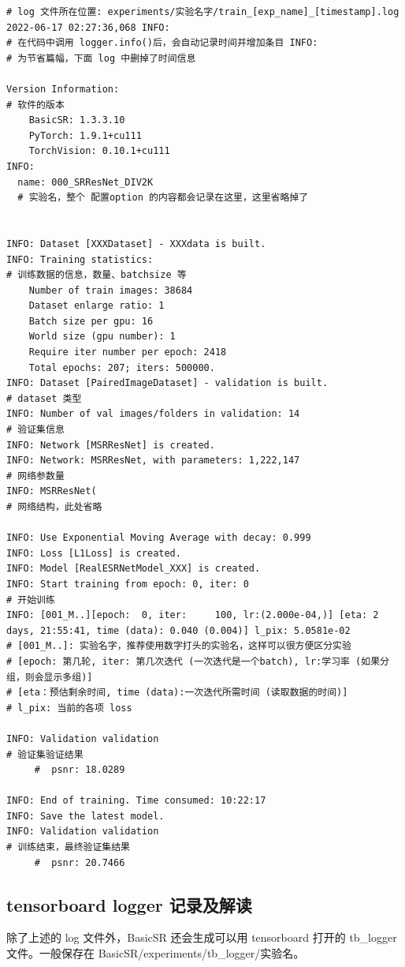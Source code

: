 \documentclass[../main.tex]{subfiles}
\begin{document}
\begin{verbatim}
# log 文件所在位置: experiments/实验名字/train_[exp_name]_[timestamp].log
2022-06-17 02:27:36,068 INFO:
# 在代码中调用 logger.info()后，会自动记录时间并增加条目 INFO:
# 为节省篇幅，下面 log 中删掉了时间信息

Version Information:
# 软件的版本
    BasicSR: 1.3.3.10
    PyTorch: 1.9.1+cu111
    TorchVision: 0.10.1+cu111
INFO:
  name: 000_SRResNet_DIV2K
  # 实验名，整个 配置option 的内容都会记录在这里，这里省略掉了


INFO: Dataset [XXXDataset] - XXXdata is built.
INFO: Training statistics:
# 训练数据的信息，数量、batchsize 等
    Number of train images: 38684
    Dataset enlarge ratio: 1
    Batch size per gpu: 16
    World size (gpu number): 1
    Require iter number per epoch: 2418
    Total epochs: 207; iters: 500000.
INFO: Dataset [PairedImageDataset] - validation is built.
# dataset 类型
INFO: Number of val images/folders in validation: 14
# 验证集信息
INFO: Network [MSRResNet] is created.
INFO: Network: MSRResNet, with parameters: 1,222,147
# 网络参数量
INFO: MSRResNet(
# 网络结构，此处省略

INFO: Use Exponential Moving Average with decay: 0.999
INFO: Loss [L1Loss] is created.
INFO: Model [RealESRNetModel_XXX] is created.
INFO: Start training from epoch: 0, iter: 0
# 开始训练
INFO: [001_M..][epoch:  0, iter:     100, lr:(2.000e-04,)] [eta: 2 days, 21:55:41, time (data): 0.040 (0.004)] l_pix: 5.0581e-02
# [001_M..]: 实验名字，推荐使用数字打头的实验名，这样可以很方便区分实验
# [epoch: 第几轮, iter: 第几次迭代 (一次迭代是一个batch), lr:学习率 (如果分组，则会显示多组)]
# [eta：预估剩余时间, time (data):一次迭代所需时间 (读取数据的时间)]
# l_pix: 当前的各项 loss

INFO: Validation validation
# 验证集验证结果
     #  psnr: 18.0289

INFO: End of training. Time consumed: 10:22:17
INFO: Save the latest model.
INFO: Validation validation
# 训练结束，最终验证集结果
     #  psnr: 20.7466
\end{verbatim}

\subsection{tensorboard logger 记录及解读}\label{code_structure:tblog_record}

除了上述的 log 文件外，BasicSR 还会生成可以用 tensorboard 打开的 tb\_logger 文件。一般保存在 BasicSR/experiments/tb\_logger/实验名。
\end{document}
